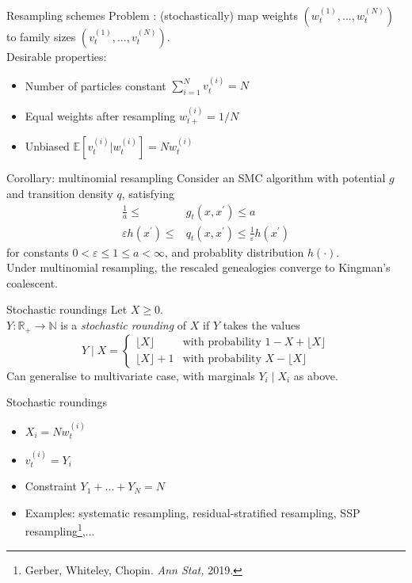 \documentclass[aspectratio=169]{beamer}
\theoremstyle{definition}
\newcommand{\E}{\mathbb{E}}
\newcommand{\vt}[2][t]{v_{#1}^{(#2)}}
\newcommand{\wt}[2][t]{w_{#1}^{(#2)}}
\begin{document}
\begin{frame}{Resampling schemes}
Problem : (stochastically) map weights $(\wt{1}, \dots, \wt{N})$ to family sizes $(\vt{1},\dots, \vt{N})$.\\

\pause
Desirable properties:
\begin{itemize}
\item Number of particles constant $\sum_{i=1}^N \vt{i} =N$
\item Equal weights after resampling $w_{t+}^{(i)} = 1/N$
\item Unbiased $\E[\vt{i} | \wt{i}] = N\wt{i}$
\end{itemize}
\end{frame}

\begin{frame}{Corollary: multinomial resampling}
Consider an SMC algorithm with potential $g$ and transition density $q$, satisfying
\begin{align*}
\frac{1}{a} \leq &g_t(x, x^\prime) \leq a \\
\varepsilon h(x^\prime) \leq &q_t(x, x^\prime) \leq \frac{1}{\varepsilon} h(x^\prime) 
\end{align*}
for constants $0<\varepsilon\leq 1\leq a<\infty$, and probablity distribution $h(\cdot)$.\\[10pt]

Under multinomial resampling, the rescaled genealogies converge to Kingman's coalescent.
\end{frame}

\begin{frame}{Stochastic roundings}
\pause
Let $X\geq 0$.\\
$Y: \mathbb{R}_+ \to \mathbb{N}$ is a \emph{stochastic rounding} of $X$ if $Y$ takes the values
\begin{equation*}
Y \mid X =
\begin{cases}
 \lfloor X \rfloor & \text{with probability } 1- X+ \lfloor X \rfloor \\
  \lfloor X \rfloor +1 & \text{with probability } X- \lfloor X \rfloor 
\end{cases}
\end{equation*}
\pause
Can generalise to multivariate case, with marginals $Y_i \mid X_i$ as above.
\end{frame}

\begin{frame}{Stochastic roundings}
\begin{itemize}
\item $X_i = N\wt{i}$
\item $\vt{i} = Y_i$
\item Constraint $Y_1+\dots +Y_N = N$
\pause
\item Examples: systematic resampling, residual-stratified resampling, SSP resampling\footnote{Gerber, Whiteley, Chopin. \textit{Ann Stat,} 2019.},...
\end{itemize}
\end{frame}
\end{document}
